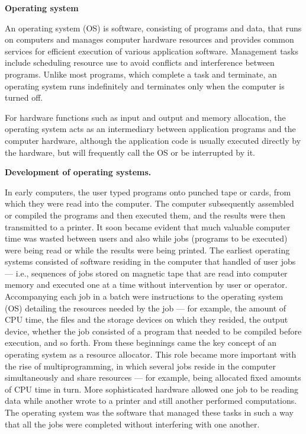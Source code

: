 \documentclass[a4paper, 12pt]{extarticle}
\begin{document}
\begin{center}
  \textbf{Operating system}
\end{center}

An operating system (OS) is software, consisting of programs and data, that runs
on computers and manages computer hardware resources and provides common
services for efficient execution of various application software. Management
tasks include scheduling resource use to avoid conflicts and interference
between programs. Unlike most programs, which complete a task and terminate, an
operating system runs indefinitely and terminates only when the computer is
turned off.

For hardware functions such as input and output and memory allocation, the
operating system acts as an intermediary between application programs and the
computer hardware, although the application code is usually executed directly by
the hardware, but will frequently call the OS or be interrupted by it.

\textbf{Development of operating systems.}

In early computers, the user typed programs onto punched tape or cards, from
which they were read into the computer. The computer subsequently assembled or
compiled the programs and then executed them, and the results were then
transmitted to a printer. It soon became evident that much valuable computer
time was wasted between users and also while jobs (programs to be executed) were
being read or while the results were being printed. The earliest operating
systems consisted of software residing in the computer that handled
 of user jobs --- i.e., sequences of jobs stored on magnetic tape
that are read into computer memory and executed one at a time without
intervention by user or operator. Accompanying each job in a batch were
instructions to the operating system (OS) detailing the resources needed by the
job --- for example, the amount of CPU time, the files and the storage devices
on which they resided, the output device, whether the job consisted of a program
that needed to be compiled before execution, and so forth. From these beginnings
came the key concept of an operating system as a resource allocator. This role
became more important with the rise of multiprogramming, in which several jobs
reside in the computer simultaneously and share resources --- for example, being
allocated fixed amounts of CPU time in turn. More sophisticated hardware allowed
one job to be reading data while another wrote to a printer and still another
performed computations. The operating system was the software that managed these
tasks in such a way that all the jobs were completed without interfering with
one another.
\end{document}
